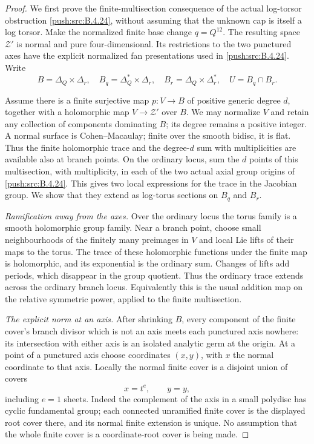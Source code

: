 \begin{proof}
We first prove the finite-multisection consequence of
the actual log-torsor obstruction \ref{push:src:B.4.24}, without
assuming that the unknown cap is itself a log torsor.
Make the normalized finite base change $q=Q^{12}$.
The resulting space $\mathcal Z'$ is normal and
pure four-dimensional. Its restrictions to the two
punctured axes have the explicit normalized fan
presentations used in \ref{push:src:B.4.24}. Write
\[
 B=\Delta_Q\times\Delta_r,\quad
 B_q=\Delta_Q^*\times\Delta_r,\quad
 B_r=\Delta_Q\times\Delta_r^*,\quad
 U=B_q\cap B_r.
\]

Assume there is a finite surjective map
$p:V\to B$ of positive generic degree $d$, together
with a holomorphic map $V\to\mathcal Z'$ over $B$.
We may normalize $V$ and retain any collection of
components dominating $B$; its degree remains a
positive integer. A normal surface is Cohen--Macaulay;
finite over the smooth bidisc, it is flat. Thus the
finite holomorphic trace and the degree-$d$ sum with
multiplicities are available also at branch points.
On the ordinary locus, sum the
$d$ points of this multisection, with multiplicity,
in each of the two actual axial group origins of
\ref{push:src:B.4.24}. This gives two local expressions for the
trace in the Jacobian group. We show that they
extend as log-torus sections on $B_q$ and $B_r$.

\emph{Ramification away from the axes.}
Over the ordinary locus the torus family is a smooth
holomorphic group family. Near a branch point, choose
small neighbourhoods of the finitely many preimages
in $V$ and local Lie lifts of their maps to the torus.
The trace of these holomorphic functions under the
finite map is holomorphic, and its exponential is
the ordinary sum. Changes of lifts add periods,
which disappear in the group quotient. Thus the
ordinary trace extends across the ordinary branch
locus. Equivalently this is the usual addition map
on the relative symmetric power, applied to the
finite multisection.

\emph{The explicit norm at an axis.}
After shrinking $B$, every component of the finite
cover's branch divisor which is not an axis meets
each punctured axis nowhere: its intersection with
either axis is an isolated analytic germ at the
origin. At a point of a punctured axis choose
coordinates $(x,y)$, with $x$ the normal coordinate
to that axis. Locally the normal finite cover is
a disjoint union of covers
\[
 x=t^e,\qquad y=y,
 \tag{B.4.26.1}
\]
including $e=1$ sheets. Indeed the complement of
the axis in a small polydisc has cyclic fundamental
group; each connected unramified finite cover is
the displayed root cover there, and its normal
finite extension is unique. No assumption that the
whole finite cover is a coordinate-root cover is
being made.


\end{proof}
